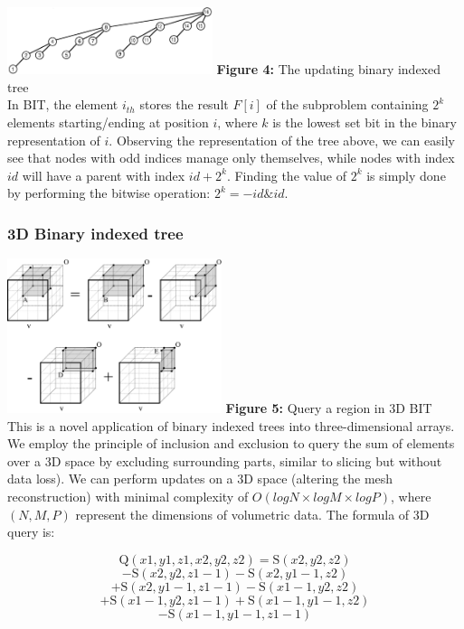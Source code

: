 \documentclass[11pt]{article}
\begin{document}
\begin{multicols}{2}
\includegraphics[width=0.45\textwidth]{Figures/Fenwick Tree.png}
\textbf{Figure 4:} The updating binary indexed tree \cite{fenwick} \\

In BIT, the element $i_{th}$ stores the result $F[i]$ of the subproblem containing $2^k$ elements starting/ending at position $i$, where $k$ is the lowest set bit in the binary representation of $i$. Observing the representation of the tree above, we can easily see that nodes with odd indices manage only themselves, while nodes with index $id$ will have a parent with index $id + 2^k$. Finding the value of $2^k$ is simply done by performing the bitwise operation: $2^k = -id \& id$.


\subsubsection{3D Binary indexed tree}

\includegraphics[width=0.47\textwidth]{Figures/3D BIT.png}
\textbf{Figure 5:} Query a region in 3D BIT \\

This is a novel application of binary indexed trees into three-dimensional arrays. We employ the principle of inclusion and exclusion to query the sum of elements over a 3D space by excluding surrounding parts, similar to slicing but without data loss). We can perform updates on a 3D space (altering the mesh reconstruction) with minimal complexity of $O(logN \times logM \times logP)$, where $(N, M, P)$ represent the dimensions of volumetric data. The formula of 3D query is:

$$ \text{Q}(x1, y1, z1, x2, y2, z2) = \text{S}(x2, y2, z2) $$
$$ - \text{S}(x2, y2, z1 - 1) - \text{S}(x2, y1 - 1, z2) $$
$$ + \text{S}(x2, y1 - 1, z1 - 1) - \text{S}(x1 - 1, y2, z2) $$
$$ + \text{S}(x1 - 1, y2, z1 - 1) + \text{S}(x1 - 1, y1 - 1, z2) $$
$$ - \text{S}(x1 - 1, y1 - 1, z1 - 1) $$


\end{multicols}
\end{document}
